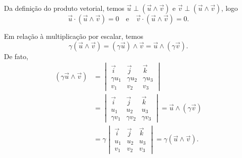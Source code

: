 Da definição do produto vetorial, temos $\vec{u}\perp(\vec{u}\land\vec{v})$ e $\vec{v}\perp(\vec{u}\land\vec{v})$, logo
\begin{equation}
  \vec{u}\cdot(\vec{u}\land\vec{v}) = 0\quad\text{e}\quad\vec{v}\cdot(\vec{u}\land\vec{v}) = 0.
\end{equation}

Em relação à multiplicação por escalar, temos
\begin{equation}
  \gamma(\vec{u}\land\vec{v}) = (\gamma\vec{u})\land\vec{v} = \vec{u}\land(\gamma\vec{v}).
\end{equation}
De fato,
\begin{align}
  (\gamma\vec{u}\land\vec{v}) &=
                                \begin{vmatrix}
                                  \vec{i} & \vec{j} & \vec{k} \\
                                  \gamma u_1 & \gamma u_2 & \gamma u_3\\
                                  v_1 & v_2 & v_3
                                \end{vmatrix} \\
                              &=
                                \begin{vmatrix}
                                  \vec{i} & \vec{j} & \vec{k} \\
                                  u_1 & u_2 & u_3\\
                                  \gamma v_1 & \gamma v_2 & \gamma v_3
                                \end{vmatrix} = \vec{u}\land(\gamma\vec{v})\\
                              &= \gamma\begin{vmatrix}
                                  \vec{i} & \vec{j} & \vec{k} \\
                                  u_1 & u_2 & u_3\\
                                  v_1 & v_2 & v_3
                                \end{vmatrix} = \gamma(\vec{u}\land\vec{v}).\\
\end{align}

